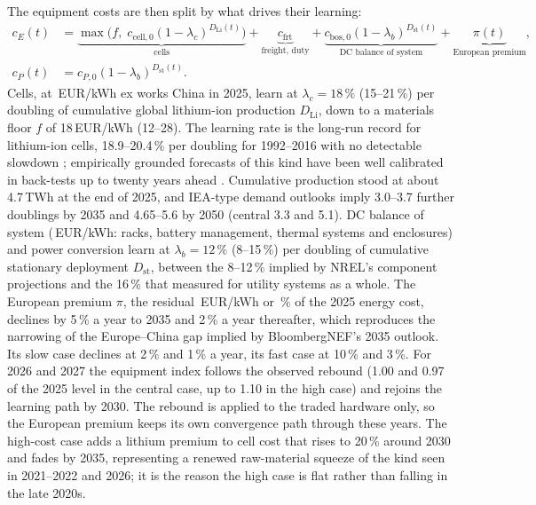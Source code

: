 \documentclass[11pt]{article}
\newcommand{\EUR}{EUR}
\begin{document}
The equipment costs are then split by what drives their learning:
\begin{equation}\label{eq:components}
\begin{aligned}
c_E(t) &= \underbrace{\max\!\bigl(f,\; c_{\mathrm{cell},0}(1-\lambda_c)^{D_{\mathrm{Li}}(t)}\bigr)}_{\text{cells}}
 + \underbrace{c_{\mathrm{frt}}}_{\text{freight, duty}}
 + \underbrace{c_{\mathrm{bos},0}(1-\lambda_b)^{D_{\mathrm{st}}(t)}}_{\text{DC balance of system}}
 + \underbrace{\pi(t)}_{\text{European premium}},\\
c_P(t) &= c_{P,0}(1-\lambda_b)^{D_{\mathrm{st}}(t)}.
\end{aligned}
\end{equation}
Cells, at \,\EUR/kWh ex works China in 2025, learn at $\lambda_c=18\,\%$ (15--21\,\%) per doubling of cumulative global lithium-ion production $D_{\mathrm{Li}}$, down to a materials floor $f$ of 18\,\EUR/kWh (12--28). The learning rate is the long-run record for lithium-ion cells, 18.9--20.4\,\% per doubling for 1992--2016 with no detectable slowdown \citep{ziegler2021rates}; empirically grounded forecasts of this kind have been well calibrated in back-tests up to twenty years ahead \citep{way2022empirical}.
Cumulative production stood at about 4.7\,TWh at the end of 2025, and IEA-type demand outlooks imply 3.0--3.7 further doublings by 2035 and 4.65--5.6 by 2050 (central 3.3 and 5.1).
DC balance of system (\,\EUR/kWh: racks, battery management, thermal systems and enclosures) and power conversion learn at $\lambda_b=12\,\%$ (8--15\,\%) per doubling of cumulative stationary deployment $D_{\mathrm{st}}$, between the 8--12\,\% implied by NREL's component projections and the 16\,\% that \citet{schmidt2017experience} measured for utility systems as a whole.
The European premium $\pi$, the residual \,\EUR/kWh or \,\% of the 2025 energy cost, declines by 5\,\% a year to 2035 and 2\,\% a year thereafter, which reproduces the narrowing of the Europe--China gap implied by BloombergNEF's 2035 outlook. Its slow case declines at 2\,\% and 1\,\% a year, its fast case at 10\,\% and 3\,\%.
For 2026 and 2027 the equipment index follows the observed rebound (1.00 and 0.97 of the 2025 level in the central case, up to 1.10 in the high case) and rejoins the learning path by 2030. The rebound is applied to the traded hardware only, so the European premium keeps its own convergence path through these years.
The high-cost case adds a lithium premium to cell cost that rises to 20\,\% around 2030 and fades by 2035, representing a renewed raw-material squeeze of the kind seen in 2021--2022 and 2026; it is the reason the high case is flat rather than falling in the late 2020s.
\end{document}

